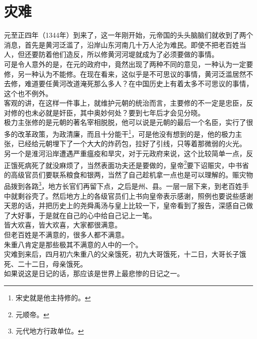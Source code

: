 \section{灾难}
\ifnum{}
	\begin{multicols}{\theparacolNo}
\fi
元至正四年（1344年）到来了，这一年刚开始，元帝国的头头脑脑们就收到了两个消息，首先是黄河泛滥了，沿岸山东河南几十万人沦为难民。即使不把老百姓当人，但还要防着他们造反，所以修黄河河堤就成为了必须要做的事情。\\

可是令人意外的是，在元的政府中，竟然出现了两种不同的意见，一种认为一定要修，另一种认为不能修。在现在看来，这似乎是不可思议的事情，黄河泛滥居然不去修，难道要任黄河改道淹死那么多人？在中国历史上有着太多不可思议的事情，这个也不例外。\\

客观的讲，在这样一件事上，就维护元朝的统治而言，主要修的不一定是忠臣，反对修的也未必就是奸臣，其中奥妙何处？要到七年后才会见分晓。\\

极力主张修的是元朝的著名宰相脱脱，他可以说是元朝的最后一个名臣，实行了很多的改革政策，为政清廉，而且十分能干\footnote{宋史就是他主持修的。}，可是他没有想到的是，他的极力主张，已经给元朝埋下了一个大大的炸药包，拉好了引线，只等着那微弱的火光。\\

另一个是淮河沿岸遭遇严重瘟疫和旱灾，对于元政府来说，这个比较简单一点，反正饿死病死了就没麻烦了，当然表面功夫还是要做的，皇帝\footnote{元顺帝。}要下诏赈灾，中书省的高级官员们要联系粮食和银两，当然了自己趁机拿一点也是可以理解的。赈灾物品拨到各路\footnote{元代地方行政单位。}，地方长官们再留下点，之后是州、县。一层一层下来，到老百姓手中就剩谷壳了。然后地方上的各级官员们上书向皇帝表示感谢，照例也要说些感谢天恩的话，并把历史上的尧舜禹汤与皇上比较一下，皇帝看到了报告，深感自己做了大好事，于是就在自己的心中给自己记上一笔。\\

皆大欢喜，皆大欢喜，大家都很满意。\\

但老百姓是不满意的，很多人都不满意。\\

朱重八肯定是那些极其不满意的人中的一个。\\

灾难到来后，四月初六朱重八的父亲饿死，初九大哥饿死，十二日，大哥长子饿死、二十二日，母亲饿死。\\

如果说这是日记的话，那应该是世界上最悲惨的日记之一。\\


\end{multicols}
